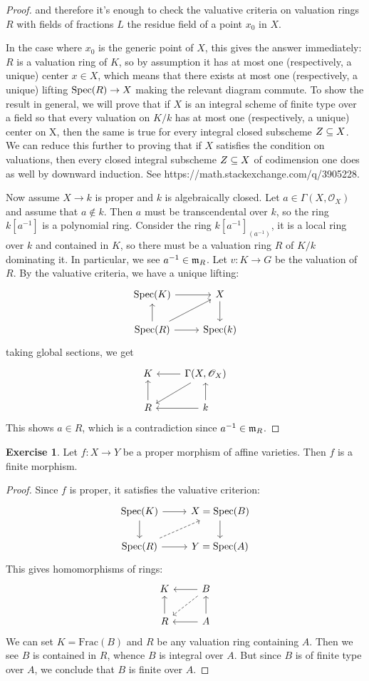 \documentclass[11pt]{book}
\theoremstyle{definition}
\newtheorem{exercise}{Exercise}[section]
\begin{document}
\begin{proof}
and therefore it's enough to check the valuative criteria on valuation rings $R$ with fields of fractions $L$ the residue field of a point $x_0$ in $X$.\par
In the case where $x_0$ is the generic point of $X$, this gives the answer immediately: $R$ is a valuation ring of $K$, so by assumption it has at most one (respectively, a unique) center $x\in X$, which means that there exists at most one (respectively, a unique) lifting $\mathrm{Spec}(R)\to X$ making the relevant diagram commute. To show the result in general, we will prove that if $X$ is an integral scheme of finite type over a field so that every valuation on $K/k$ has at most one (respectively, a unique) center on X, then the same is true for every integral closed subscheme $Z\subseteq X$. We can reduce this further to proving that if $X$ satisfies the condition on valuations, then every closed integral subscheme $Z\subseteq X$ of codimension one does as well by downward induction. See https://math.stackexchange.com/q/3905228.\par
Now assume $X\to k$ is proper and $k$ is algebraically closed. Let $a\in\Gamma(X,\mathscr{O}_X)$ and assume that $a\notin k$. Then $a$ must be transcendental over $k$, so the ring $k[a^{-1}]$ is a polynomial ring. Consider the ring $k[a^{-1}]_{(a^{-1})}$, it is a local ring over $k$ and contained in $K$, so there must be a valuation ring $R$ of $K/k$ dominating it. In particular, we see $a^{-1}\in\mathfrak{m}_R$. Let $v:K\to G$ be the valuation of $R$. By the valuative criteria, we have a unique lifting:
\[\begin{tikzcd}
\Spec(K)\ar[r]&X\ar[d]\\
\Spec(R)\ar[u]\ar[ru]\ar[r]&\Spec(k)
\end{tikzcd}\]
taking global sections, we get
\[\begin{tikzcd}
K&\Gamma(X,\mathscr{O}_X)\ar[l]\ar[ld]\\
R\ar[u]&k\ar[l]\ar[u]
\end{tikzcd}\]
This shows $a\in R$, which is a contradiction since $a^{-1}\in\mathfrak{m}_R$.
\end{proof}
\begin{exercise}
Let $f:X\to Y$ be a proper morphism of affine varieties. Then $f$ is a finite morphism.
\end{exercise}
\begin{proof}
Since $f$ is proper, it satisfies the valuative criterion:
\[\begin{tikzcd}
\Spec(K)\ar[r]\ar[d]&X=\Spec(B)\ar[d]\\
\Spec(R)\ar[r]\ar[ru,dashed]&Y=\Spec(A)
\end{tikzcd}\]
This gives homomorphisms of rings:
\[\begin{tikzcd}
K&B\ar[l]\ar[ld,dashed]\\
R\ar[u]&A\ar[l]\ar[u]
\end{tikzcd}\]
We can set $K=\mathrm{Frac}(B)$ and $R$ be any valuation ring containing $A$. Then we see $B$ is contained in $R$, whence $B$ is integral over $A$. But since $B$ is of finite type over $A$, we conclude that $B$ is finite over $A$.
\end{proof}
\end{document}
